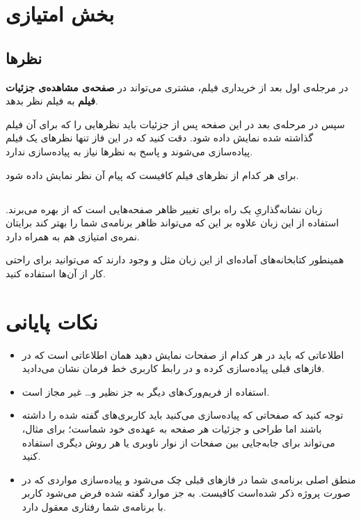 \documentclass{utap}
\begin{document}
    
    
    
    
    
    \section{بخش امتیازی}
    	\subsection{نظر‌ها}
    	در مرجله‌ی اول بعد از خریداری فیلم، مشتری می‌تواند در  
    	\textbf{صفحه‌ی مشاهده‌ی جزئیات فیلم}
    	به فیلم نظر بدهد. 
    	
    	سپس در مرحله‌ی بعد در این صفحه پس از جزئیات باید نظرهایی را که برای آن فیلم گذاشته شده نمایش داده شود. دقت کنید که در این فاز تنها نظر‌های یک فیلم پیاده‌سازی می‌شوند و پاسخ به نظر‌ها نیاز به پیاده‌سازی ندارد.
    	
    	     برای هر کدام از نظر‌های فیلم کافیست که پیام آن نظر‌ نمایش داده شود.
    	
        \subsection{}
    زبان نشانه‌گذاریِ 
 یک راه برای تغییر ظاهر صفحه‌هایی است که از  بهره می‌برند. استفاده از این زبان علاوه بر این که می‌تواند ظاهر برنامه‌ی شما را بهتر کند برایتان نمره‌ی امتیازی هم به همراه دارد.
 
 همینطور کتابخانه‌های آماده‌ای از این زبان مثل
  و
  وجود دارند که می‌توانید برای راحتی کار از آن‌ها استفاده کنید. 
 
 
 
 
    \section{نکات پایانی}
        \begin{itemize}
            \item  اطلاعاتی که باید در هر کدام از صفحات نمایش دهید همان اطلاعاتی است که در فاز‌های قبلی پیاده‌سازی کرده‌ و در رابط کاربری خط فرمان نشان می‌دادید. 
            \item  
            استفاده از فریم‌ورک‌های دیگر به جز
                نظیر 
                و\dots{} غیر مجاز است.
                
            \item 
            توجه کنید که صفحاتی که پیادەسازی می‌کنید باید کاربری‌های گفته شده را داشته باشند اما طراحی و جزئیات هر صفحه به عهدەی خود شماست؛ برای مثال، می‌تواند برای جابه‌جایی بین صفحات از نوار ناوبری
            یا هر روش دیگری استفاده کنید. 
            \item 
            منطق اصلی برنامه‌ی شما در فاز‌های قبلی چک می‌شود و پیاده‌سازی مواردی که در صورت پروژه ذکر شده‌است کافیست. به جز موارد گفته شده فرض می‌شود کاربر با برنامه‌ی شما رفتاری معقول دارد.
    	\end{itemize}
\end{document}
